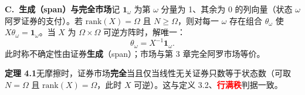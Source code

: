 \begin{tcolorbox}[knowledge,title=4.1 一般市场结构]
\tcbline

\textbf{C.\ 生成（span）与完全市场}\quad 记 $\mathbf{1}_\omega$ 为第 $\omega$ 分量为 1、其余为 0 的列向量（状态 $\omega$ 阿罗证券的支付）。若 $\mathrm{rank}(X)=\Omega$ 且 $N\ge\Omega$，则对每一 $\omega$ 存在组合 $\theta_\omega$ 使 $X\theta_\omega=\mathbf{1}_\omega$。当 $X$ 为 $\Omega\times\Omega$ 可逆方阵时，解唯一：
\[
    \theta_\omega=X^{-1}\mathbf{1}_\omega.
\]
此时称不确定性由证券\textbf{生成}（span）；市场与第 3 章完全阿罗市场等价。

\begin{tcolorbox}[knowledge]
\textbf{定理 4.1}\quad 无摩擦时，证券市场\textbf{完全}当且仅当线性无关证券只数等于状态数（可取 $N=\Omega$ 且 $\mathrm{rank}(X)=\Omega$，此时 $X$ 可逆）。这与定义 3.2、\textcolor{red}{\textbf{行满秩}}判据一致。
\end{tcolorbox}
\end{tcolorbox}


